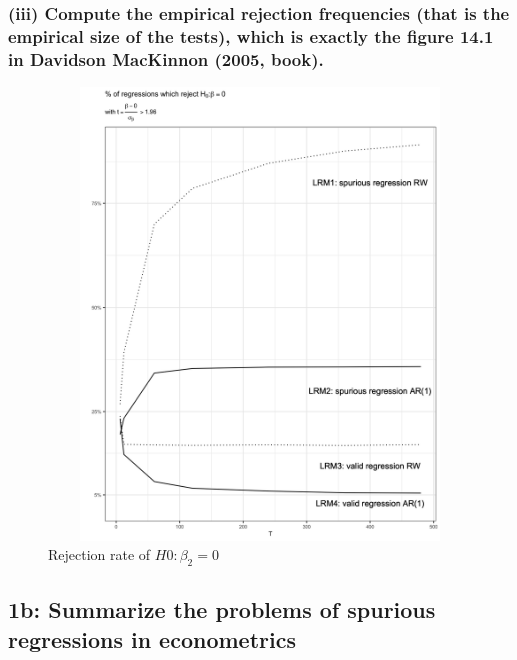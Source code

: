 \documentclass[]{article}
\begin{document}
\newpage
\subsubsection*{(iii) Compute the empirical rejection frequencies (that is the empirical size of the tests), which is exactly the figure 14.1 in Davidson MacKinnon (2005, book).}

\begin{figure}[H]
	\centering
	\includegraphics[width=14cm, height=12cm]{"./1aiii_chart"}
	\caption[]{Rejection rate of $H0: \beta_2=0$}
\end{figure}

\newpage
\subsection*{1b: Summarize the problems of spurious regressions in econometrics}
\end{document}

